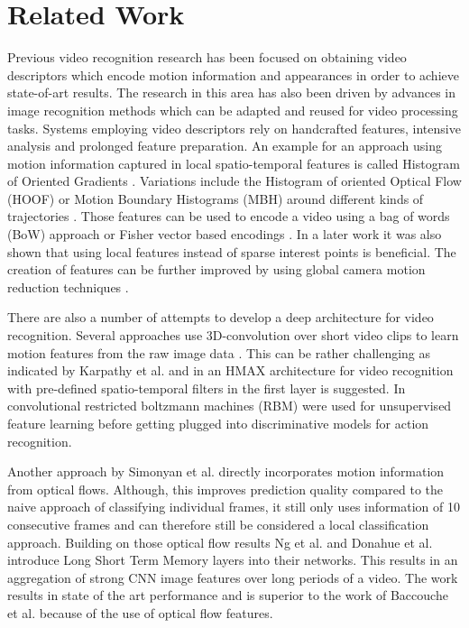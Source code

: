 \section{Related Work}
\label{sec:related}

Previous video recognition research has been focused on obtaining video descriptors which encode motion information and appearances in order to achieve state-of-art results. The research in this area has also been driven by advances in image recognition methods which can be adapted and reused for video processing tasks. Systems employing video descriptors rely on handcrafted features, intensive analysis and prolonged feature preparation. An example for an approach using motion information captured in local spatio-temporal features is called Histogram of Oriented Gradients \cite{dalal2005histograms}. Variations include the Histogram of oriented Optical Flow (HOOF) \cite{hoof} or Motion Boundary Histograms (MBH) \cite{dalal2006human} around different kinds of trajectories \cite{goodale1992separate}. Those features can be used to encode a video using a bag of words (BoW) approach \cite{laptev2008learning} or Fisher vector based encodings \cite{wang2013action}. In a later work \cite{wang2009evaluation} it was also shown that using local features instead of sparse interest points is beneficial. The creation of features can be further improved by using global camera motion reduction techniques \cite{jain2013better, kuehne2011hmdb, wang2013action}.

There are also a number of attempts to develop a deep architecture for video recognition. Several approaches use 3D-convolution over short video clips to learn motion features from the raw image data \cite{baccouche2011sequential, ji20133d, karpathy2014large}. This can be rather challenging as indicated by Karpathy et al. \cite{karpathy2014large} and in \cite{jhuang2007biologically} an HMAX architecture for video recognition with pre-defined spatio-temporal filters in the first layer is suggested. In \cite{chen2010deep}\cite{le2011learning}\cite{taylor2010convolutional} convolutional restricted boltzmann machines (RBM) were used for unsupervised feature learning  before getting plugged into discriminative models for action recognition.

Another approach by Simonyan et al. \cite{simonyan2014two} directly incorporates motion information from optical flows. Although, this improves prediction quality compared to the naive approach of classifying individual frames, it still only uses information of 10 consecutive frames and can therefore still be considered a local classification approach. Building on those optical flow results Ng et al. \cite{ng2015beyond} and Donahue et al. \cite{donahue2014long} introduce Long Short Term Memory layers into their networks. This results in an aggregation of strong CNN image features over long periods of a video. The work results in state of the art performance and is superior to the work of Baccouche et al. \cite{baccouche2010action} because of the use of optical flow features.

